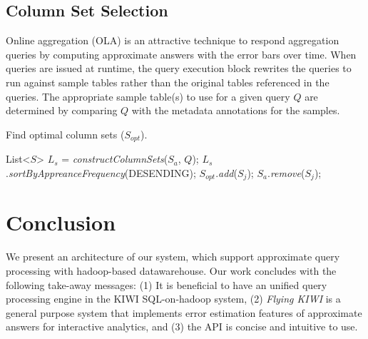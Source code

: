 \documentclass{sig-alternate-05-2015}
\begin{document}
\subsection{Column Set Selection}
Online aggregation (OLA) is an attractive technique to respond aggregation queries by computing approximate answers with the error bars over time.
When queries are issued at runtime, the query execution block rewrites the queries to run against sample tables rather than the original tables referenced in the queries.
The appropriate sample table(s) to use for a given query $Q$ are determined by comparing $Q$ with the metadata annotations for the samples.
\begin{algorithm}
\caption{Find optimal column sets ($S_{opt}$).}
\label{algo:columnset}
\begin{algorithmic}[1]
	\State List<$S$> $L_{s}$ = \textit{constructColumnSets}($S_a$, $Q$);
	\State $L_{s}$.\textit{sortByAppreanceFrequency}(DESENDING);
	\Return
	\Else 	
	\State $S_{opt}$.\textit{add}($S_j$); 
	\State $S_a$.\textit{remove}($S_j$); 
	\EndIf
	\EndFor
	\EndProcedure
\end{algorithmic}
\end{algorithm}


\section{Conclusion}
We present an architecture of our  system, which support approximate query processing with hadoop-based datawarehouse.
Our work concludes with the following take-away messages:
(1) It is beneficial to have an unified query processing engine in the KIWI SQL-on-hadoop system,
(2) \textit{Flying KIWI} is a general purpose system that implements error estimation features of approximate answers for interactive analytics, and (3) the API is concise and intuitive to use.
\end{document}

